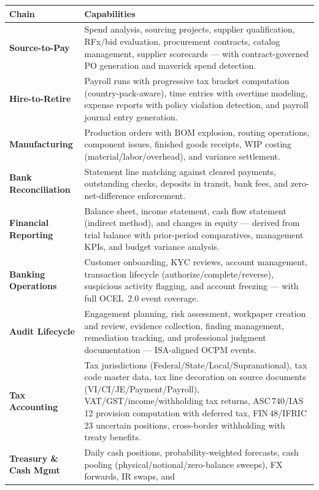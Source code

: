 \documentclass[11pt,a4paper]{article}
\begin{document}
\vspace{0.4em}
\noindent
\renewcommand{\arraystretch}{1.25}
\begin{tabularx}{\textwidth}{>{\bfseries\color{brand}}l X}
\toprule
\textbf{Chain} & \textbf{Capabilities} \\
\midrule
Source-to-Pay &
  Spend analysis, sourcing projects, supplier qualification, RFx/bid
  evaluation, procurement contracts, catalog management, supplier
  scorecards --- with contract-governed PO generation and maverick spend
  detection. \\
Hire-to-Retire &
  Payroll runs with progressive tax bracket computation (country-pack-aware),
  time entries with overtime modeling, expense reports with policy violation
  detection, and payroll journal entry generation. \\
Manufacturing &
  Production orders with BOM explosion, routing operations, component
  issues, finished goods receipts, WIP costing (material/labor/overhead),
  and variance settlement. \\
Bank Reconciliation &
  Statement line matching against cleared payments, outstanding checks,
  deposits in transit, bank fees, and zero-net-difference enforcement. \\
Financial Reporting &
  Balance sheet, income statement, cash flow statement (indirect method),
  and changes in equity --- derived from trial balance with prior-period
  comparatives, management KPIs, and budget variance analysis. \\
Banking Operations &
  Customer onboarding, KYC reviews, account management, transaction
  lifecycle (authorize/complete/reverse), suspicious activity flagging,
  and account freezing --- with full OCEL~2.0 event coverage. \\
Audit Lifecycle &
  Engagement planning, risk assessment, workpaper creation and review,
  evidence collection, finding management, remediation tracking, and
  professional judgment documentation --- ISA-aligned OCPM events. \\
Tax Accounting &
  Tax jurisdictions (Federal/State/Local/Supranational), tax code master data,
  tax line decoration on source documents (VI/CI/JE/Payment/Payroll),
  VAT/GST/income/withholding tax returns, ASC\,740/IAS\,12 provision
  computation with deferred tax, FIN\,48/IFRIC\,23 uncertain positions,
  cross-border withholding with treaty benefits. \\
Treasury \& Cash Mgmt &
  Daily cash positions, probability-weighted forecasts, cash pooling
  (physical/notional/zero-balance sweeps), FX forwards, IR swaps, and

\end{tabularx}
\end{document}
